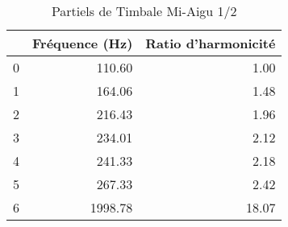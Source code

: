 \begin{table}
\centering
\caption{Partiels de Timbale Mi-Aigu 1/2}
\label{table:partiels-timbale-miaigu-2.wav}
\begin{tabular}{lrr}
\toprule
{} &  Fréquence (Hz) &  Ratio d'harmonicité \\
\midrule
0 &          110.60 &                 1.00 \\
1 &          164.06 &                 1.48 \\
2 &          216.43 &                 1.96 \\
3 &          234.01 &                 2.12 \\
4 &          241.33 &                 2.18 \\
5 &          267.33 &                 2.42 \\
6 &         1998.78 &                18.07 \\
\bottomrule
\end{tabular}
\end{table}
